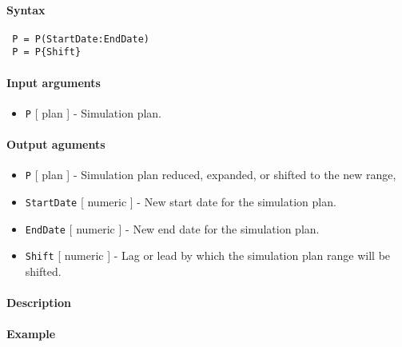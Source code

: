 


	\paragraph{Syntax}
 
 \begin{verbatim}
 P = P(StartDate:EndDate)
 P = P{Shift}
 \end{verbatim}
 
 \paragraph{Input arguments}
 
 \begin{itemize}
 \item
   \texttt{P} {[} plan {]} - Simulation plan.
 \end{itemize}
 
 \paragraph{Output aguments}
 
 \begin{itemize}
 \item
   \texttt{P} {[} plan {]} - Simulation plan reduced, expanded, or
   shifted to the new range,
 \item
   \texttt{StartDate} {[} numeric {]} - New start date for the simulation
   plan.
 \item
   \texttt{EndDate} {[} numeric {]} - New end date for the simulation
   plan.
 \item
   \texttt{Shift} {[} numeric {]} - Lag or lead by which the simulation
   plan range will be shifted.
 \end{itemize}
 
 \paragraph{Description}
 
 \paragraph{Example}


